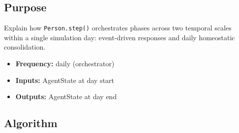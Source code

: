 \documentclass[
  letterpaper,
  DIV=11,
  numbers=noendperiod]{scrartcl}
\providecommand{\tightlist}{%
  \setlength{\itemsep}{0pt}\setlength{\parskip}{0pt}}
\begin{document}
\subsection{Purpose}\label{purpose-2}

Explain how \texttt{Person.step()} orchestrates phases across two
temporal scales within a single simulation day: event-driven responses
and daily homeostatic consolidation.

\begin{itemize}
\tightlist
\item
  \textbf{Frequency:} daily (orchestrator)
\item
  \textbf{Inputs:} AgentState at day start
\item
  \textbf{Outputs:} AgentState at day end
\end{itemize}

\subsection{Algorithm}\label{algorithm}
\end{document}
